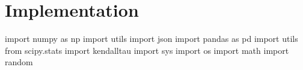 \documentclass[
  letterpaper,
  DIV=11,
  numbers=noendperiod]{scrreprt}
\newenvironment{Shaded}{\begin{snugshade}}{\end{snugshade}}
\newcommand{\ImportTok}[1]{\textcolor[rgb]{0.00,0.46,0.62}{#1}}
\newcommand{\NormalTok}[1]{\textcolor[rgb]{0.00,0.23,0.31}{#1}}
\begin{document}
\section{Implementation}\label{implementation-3}

\begin{Shaded}
\begin{Highlighting}[]
\ImportTok{import}\NormalTok{ numpy }\ImportTok{as}\NormalTok{ np }
\ImportTok{import}\NormalTok{ utils }
\ImportTok{import}\NormalTok{ json }
\ImportTok{import}\NormalTok{ pandas }\ImportTok{as}\NormalTok{ pd }
\ImportTok{import}\NormalTok{ utils }
\ImportTok{from}\NormalTok{ scipy.stats }\ImportTok{import}\NormalTok{ kendalltau}
\ImportTok{import}\NormalTok{ sys}
\ImportTok{import}\NormalTok{ os}
\ImportTok{import}\NormalTok{ math }
\ImportTok{import}\NormalTok{ random }
\end{Highlighting}
\end{Shaded}
\end{document}

